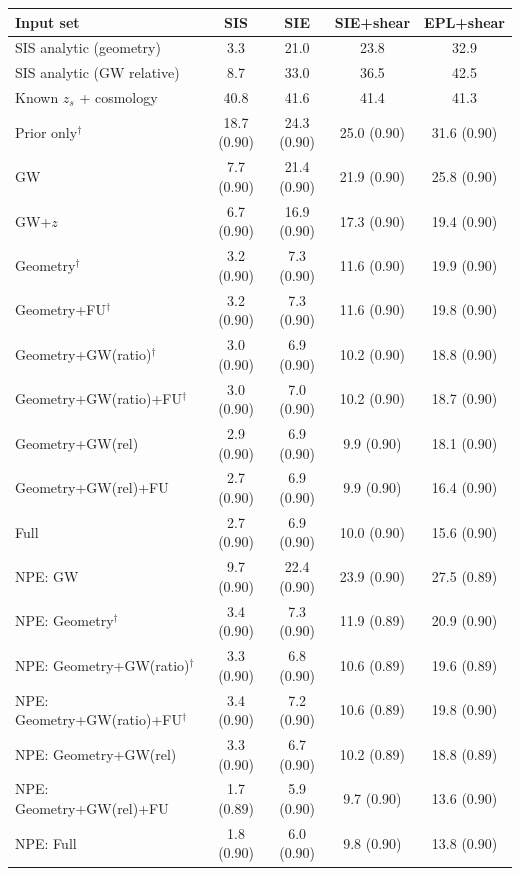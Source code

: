 \begin{tabular*}{\linewidth}{@{\extracolsep{\fill}}lcccc@{}}
\toprule
Input set & SIS & SIE & SIE+shear & EPL+shear \\
\midrule
SIS analytic (geometry) & 3.3 & 21.0 & 23.8 & 32.9 \\
SIS analytic (GW relative) & 8.7 & 33.0 & 36.5 & 42.5 \\
Known $z_s$ + cosmology & 40.8 & 41.6 & 41.4 & 41.3 \\
\midrule
Prior only$^\dagger$ & 18.7 (0.90) & 24.3 (0.90) & 25.0 (0.90) & 31.6 (0.90) \\
GW & 7.7 (0.90) & 21.4 (0.90) & 21.9 (0.90) & 25.8 (0.90) \\
GW+$z$ & 6.7 (0.90) & 16.9 (0.90) & 17.3 (0.90) & 19.4 (0.90) \\
Geometry$^\dagger$ & 3.2 (0.90) & 7.3 (0.90) & 11.6 (0.90) & 19.9 (0.90) \\
Geometry+FU$^\dagger$ & 3.2 (0.90) & 7.3 (0.90) & 11.6 (0.90) & 19.8 (0.90) \\
Geometry+GW(ratio)$^\dagger$ & 3.0 (0.90) & 6.9 (0.90) & 10.2 (0.90) & 18.8 (0.90) \\
Geometry+GW(ratio)+FU$^\dagger$ & 3.0 (0.90) & 7.0 (0.90) & 10.2 (0.90) & 18.7 (0.90) \\
Geometry+GW(rel) & 2.9 (0.90) & 6.9 (0.90) & 9.9 (0.90) & 18.1 (0.90) \\
Geometry+GW(rel)+FU & 2.7 (0.90) & 6.9 (0.90) & 9.9 (0.90) & 16.4 (0.90) \\
Full & 2.7 (0.90) & 6.9 (0.90) & 10.0 (0.90) & 15.6 (0.90) \\
\midrule
NPE: GW & 9.7 (0.90) & 22.4 (0.90) & 23.9 (0.90) & 27.5 (0.89) \\
NPE: Geometry$^\dagger$ & 3.4 (0.90) & 7.3 (0.90) & 11.9 (0.89) & 20.9 (0.90) \\
NPE: Geometry+GW(ratio)$^\dagger$ & 3.3 (0.90) & 6.8 (0.90) & 10.6 (0.89) & 19.6 (0.89) \\
NPE: Geometry+GW(ratio)+FU$^\dagger$ & 3.4 (0.90) & 7.2 (0.90) & 10.6 (0.89) & 19.8 (0.90) \\
NPE: Geometry+GW(rel) & 3.3 (0.90) & 6.7 (0.90) & 10.2 (0.89) & 18.8 (0.89) \\
NPE: Geometry+GW(rel)+FU & 1.7 (0.89) & 5.9 (0.90) & 9.7 (0.90) & 13.6 (0.90) \\
NPE: Full & 1.8 (0.90) & 6.0 (0.90) & 9.8 (0.90) & 13.8 (0.90) \\
\bottomrule
\end{tabular*}